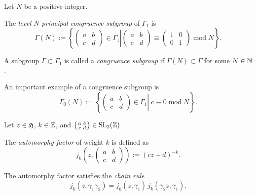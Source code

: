 Let $N$ be a positive integer.
\begin{definition}\label{def-level-N-princ-cong-subgp}
    The \emph{level $N$ principal congruence subgroup} of $\Gamma_1$ is
    $$\Gamma(N):=\left\{\left.\left(\begin{smallmatrix}a&b\\c&d\end{smallmatrix}\right)\in\Gamma_1\right|\left(\begin{smallmatrix}a&b\\c&d\end{smallmatrix}\right)\equiv\left(\begin{smallmatrix}1&0\\0&1\end{smallmatrix}\right)\;\mathrm{mod}\;N\right\}.$$
\end{definition}

\begin{definition}\label{def-congruence-subgroup}
    A subgroup $\Gamma\subset\Gamma_1$ is called a \emph{congruence subgroup} if $\Gamma(N)\subset\Gamma$ for some $N\in\mathbb{N}$.
\end{definition}

An important example of a congruence subgroup is
$$\Gamma_0(N):=\left\{\left.\left(\begin{smallmatrix}a&b\\c&d\end{smallmatrix}\right)\in\Gamma_1\right|\;c\equiv0\;\mathrm{mod}\;N\right\}.$$

Let $z\in\mathfrak{H}$, $k\in\mathbb{Z}$, and $\left(\begin{smallmatrix}a&b\\c&d\end{smallmatrix}\right)\in\mathrm{SL}_2(\mathbb{Z})$.
\begin{definition}\label{def-automorphy-factor}
    The \emph{automorphy factor} of weight $k$ is defined as
$$j_k(z,\left(\begin{smallmatrix}a&b\\c&d\end{smallmatrix}\right)):=(cz+d)^{-k}.$$
\end{definition}

\begin{lemma}\label{lemma-automorphy-factor-chain-rule}
    The automorphy factor satisfies the \emph{chain rule}
$$j_k(z,\gamma_1\gamma_2)=j_k(z,\gamma_1)\,j_k(\gamma_2z,\gamma_1). $$
\end{lemma}

